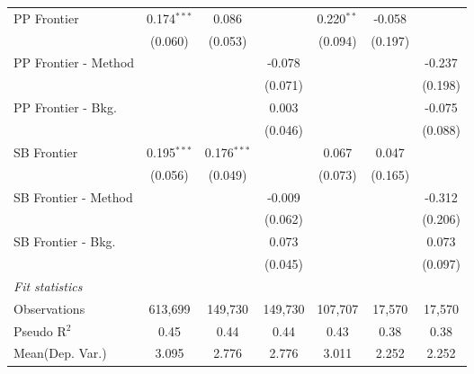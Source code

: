 \begin{tabular}{lcccccc}
   PP Frontier          & 0.174$^{***}$ & 0.086         &               & 0.220$^{**}$  & -0.058        &   \\   
                        & (0.060)       & (0.053)       &               & (0.094)       & (0.197)       &   \\   
   PP Frontier - Method &               &               & -0.078        &               &               & -0.237\\   
                        &               &               & (0.071)       &               &               & (0.198)\\   
   PP Frontier - Bkg.   &               &               & 0.003         &               &               & -0.075\\   
                        &               &               & (0.046)       &               &               & (0.088)\\   
   SB Frontier          & 0.195$^{***}$ & 0.176$^{***}$ &               & 0.067         & 0.047         &   \\   
                        & (0.056)       & (0.049)       &               & (0.073)       & (0.165)       &   \\   
   SB Frontier - Method &               &               & -0.009        &               &               & -0.312\\   
                        &               &               & (0.062)       &               &               & (0.206)\\   
   SB Frontier - Bkg.   &               &               & 0.073         &               &               & 0.073\\   
                        &               &               & (0.045)       &               &               & (0.097)\\   
   \midrule
   \emph{Fit statistics}\\
   Observations         & 613,699       & 149,730       & 149,730       & 107,707       & 17,570        & 17,570\\  
   Pseudo R$^2$         & 0.45          & 0.44          & 0.44          & 0.43          & 0.38          & 0.38\\  
Mean(Dep. Var.) & 3.095 & 2.776 & 2.776 & 3.011 & 2.252 & 2.252 \\
   

\end{tabular}
